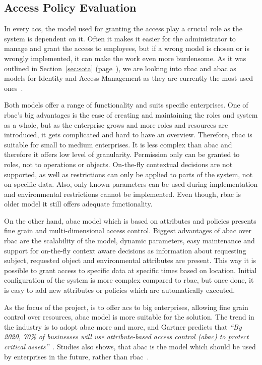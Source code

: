 \subsection{Access Policy Evaluation}\label{sec:analysis-access-policy}

In every \acrlong{acs}, the model used for granting the access play a crucial role as the system is dependent on it. Often it makes it easier for the administrator to manage and grant the access to employees, but if a wrong model is chosen or is wrongly implemented, it can make the work even more burdensome. As it was outlined in Section~\ref{sec:sota} (page~\pageref{sec:sota}), we are looking into \acrshort{rbac} and \acrshort{abac} as models for Identity and Access Management as they are currently the most used ones~\cite{2018BestV3}.

Both models offer a range of functionality and suits specific enterprises. One of \acrshort{rbac}’s big advantages is the ease of creating and maintaining the roles and system as a whole, but as the enterprise grows and more roles and resources are introduced, it gets complicated and hard to have an overview. Therefore, \acrshort{rbac} is suitable for small to medium enterprises. It is less complex than \acrshort{abac} and therefore it offers low level of granularity. Permission only can be granted to roles, not to operations or objects. On-the-fly contextual decisions are not supported, as well as restrictions can only be applied to parts of the system, not on specific data. Also, only known parameters can be used during implementation and environmental restrictions cannot be implemented. Even though, \acrshort{rbac} is older model it still offers adequate functionality.

On the other hand, \acrshort{abac} model which is based on attributes and policies presents fine grain and multi-dimensional access control. Biggest advantages of \acrshort{abac} over \acrshort{rbac} are the scalability of the model, dynamic parameters, easy maintenance and support for on-the-fly context aware decisions as information about requesting subject, requested object and environmental attributes are present. This way it is possible to grant access to specific data at specific times based on location. Initial configuration of the system is more complex compared to \acrshort{rbac}, but once done, it is easy to add new attributes or policies which are automatically executed. 

As the focus of the project, is to offer \acrlong{acs} to big enterprises, allowing fine grain control over resources, \acrlong{abac} model is more suitable for the solution. The trend in the industry is to adopt \acrshort{abac} more and more, and Gartner predicts that \textit{``By 2020, 70\% of businesses will use attribute-based access control (\acrshort{abac}) to protect critical assets''}~\cite{GartnerGartnerPredictions}. Studies also shows, that \acrshort{abac} is the model which should be used by enterprises in the future, rather than \acrshort{rbac}~\cite{Fatima2016TowardsArgument}.

